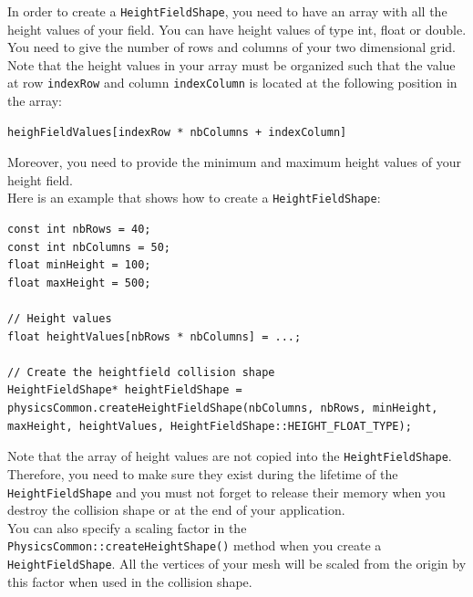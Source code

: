 \documentclass[a4paper,12pt]{article}
\begin{document}
  In order to create a \texttt{HeightFieldShape}, you need to have an array with all the height values of your field.
  You can have height values of type int, float or double. You need to give the number of rows and columns of your two
  dimensional grid. Note that the height values in your array must be organized such that the value at row
  \texttt{indexRow} and column \texttt{indexColumn} is located at the following position in the array: \\

  \begin{lstlisting}
heighFieldValues[indexRow * nbColumns + indexColumn]
  \end{lstlisting}

  \vspace{0.6cm}

  Moreover, you need to provide the minimum and maximum height values of your height field. \\

  Here is an example that shows how to create a \texttt{HeightFieldShape}: \\

  \begin{lstlisting}
const int nbRows = 40;
const int nbColumns = 50;
float minHeight = 100;
float maxHeight = 500;

// Height values
float heightValues[nbRows * nbColumns] = ...;

// Create the heightfield collision shape
HeightFieldShape* heightFieldShape = physicsCommon.createHeightFieldShape(nbColumns, nbRows, minHeight,
maxHeight, heightValues, HeightFieldShape::HEIGHT_FLOAT_TYPE);
  \end{lstlisting}

  \vspace{0.6cm}

  Note that the array of height values are not copied into the \texttt{HeightFieldShape}. Therefore, you need to make sure
  they exist during the lifetime of the \texttt{HeightField\allowbreak Shape} and you must not forget to release their memory when you
  destroy the collision shape or at the end of your application. \\

  You can also specify a scaling factor in the \texttt{PhysicsCommon::createHeightShape()} method  when you create a \texttt{Height\allowbreak FieldShape}.
  All the vertices of your mesh will be scaled from the origin by this factor when used in the collision shape. \\
\end{document}
